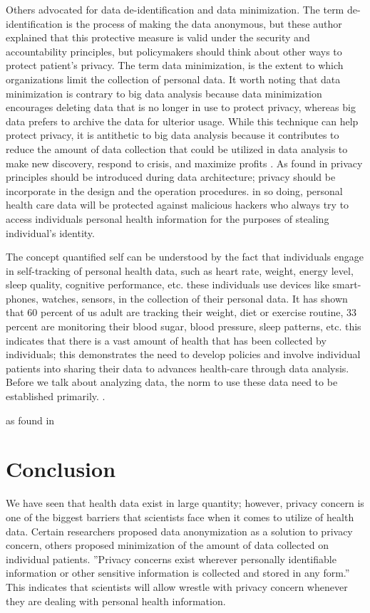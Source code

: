 \documentclass[sigconf]{acmart}
\begin{document}
Others advocated for data de-identification and data minimization. The term de-identification is the process of making the data anonymous, but these author explained that this protective measure is valid under the security and accountability principles, but policymakers should think about other ways to protect patient’s privacy. The term data minimization, is the extent to which organizations limit the collection of personal data. It worth noting that data minimization is contrary to big data analysis because data minimization encourages deleting data that is no longer in use to protect privacy, whereas big data prefers to archive the data for ulterior usage. While this technique can help protect privacy, it is antithetic to big data analysis because it contributes to reduce the amount of data collection that could be utilized in data analysis to make new discovery, respond to crisis, and maximize profits \cite{tene2012big}. 
As found in \cite{cavoukian2012privacy} privacy principles should be introduced during data architecture; privacy should be incorporate in the design and the operation procedures. in so doing, personal health care data will be protected against malicious hackers who always try to access individuals personal health information for the purposes of stealing individual's identity. 

The concept quantified self can be understood by the fact that individuals engage in self-tracking of personal health data, such as heart rate, weight, energy level, sleep quality, cognitive performance, etc. these individuals use devices like smart-phones, watches, sensors, in the collection of their personal data. It has shown that 60 percent of us adult are tracking their weight, diet or exercise routine, 33 percent are monitoring their blood sugar, blood pressure, sleep patterns, etc. this indicates that there is a vast amount of health that has been collected by individuals; this demonstrates the need to develop policies and involve individual patients into sharing their data to advances health-care through data analysis. Before we talk about analyzing data, the norm to use these data need to be established primarily. \cite{swan2013quantified}.

as found in 



\section{Conclusion}

We have seen that health data exist in large quantity; however, privacy concern is one of the biggest barriers that scientists face when it comes to utilize of health data. Certain researchers proposed data anonymization as a solution to privacy concern, others proposed minimization of the amount of data collected on individual patients. ''Privacy concerns exist wherever personally identifiable information or other sensitive information is collected and stored in any form.''\cite{khan2014big} This indicates that scientists will allow wrestle with privacy concern whenever they are dealing with personal health information.  
\end{document}

